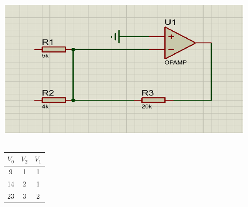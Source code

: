 \documentclass{article}
\begin{document}
  		\begin{center}
			\includegraphics[width=13cm, height=8cm]{./images/4.4}    	
        \end{center}
		\begin{table}[h]
			\begin{center}
				\begin{tabular}{|c|c|c|}
					\hline
					$V_0$ & $V_2$ & $V_1$ \\
					\hline
					\hline
					9 & 1 & 1 \\
					\hline
					14 & 2 & 1 \\
					\hline
					23 & 3 & 2\\
					\hline
				\end{tabular}
			\end{center}
		\end{table}
		       	
\end{document}
